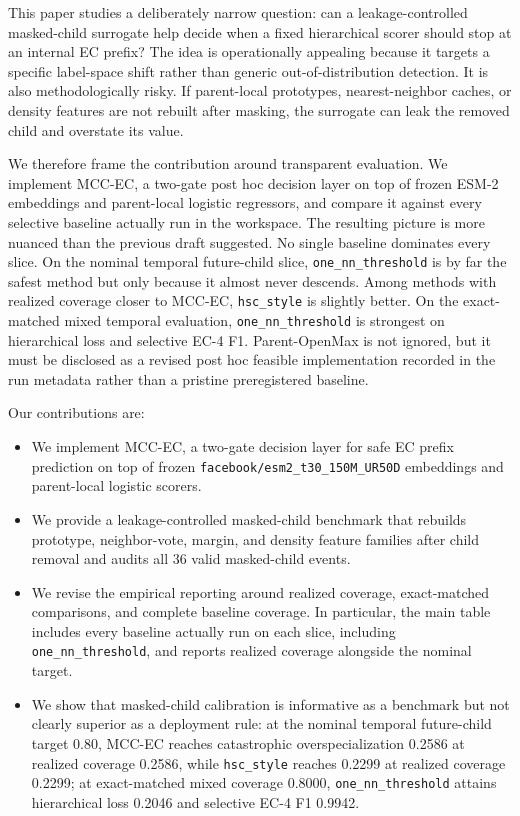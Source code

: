 \documentclass{article}
\newcommand{\method}{MCC-EC\xspace}
\begin{document}
This paper studies a deliberately narrow question: can a leakage-controlled masked-child surrogate help decide when a fixed hierarchical scorer should stop at an internal EC prefix? The idea is operationally appealing because it targets a specific label-space shift rather than generic out-of-distribution detection. It is also methodologically risky. If parent-local prototypes, nearest-neighbor caches, or density features are not rebuilt after masking, the surrogate can leak the removed child and overstate its value.

We therefore frame the contribution around transparent evaluation. We implement \method, a two-gate post hoc decision layer on top of frozen ESM-2 embeddings and parent-local logistic regressors, and compare it against every selective baseline actually run in the workspace. The resulting picture is more nuanced than the previous draft suggested. No single baseline dominates every slice. On the nominal temporal future-child slice, \texttt{one\_nn\_threshold} is by far the safest method but only because it almost never descends. Among methods with realized coverage closer to \method, \texttt{hsc\_style} is slightly better. On the exact-matched mixed temporal evaluation, \texttt{one\_nn\_threshold} is strongest on hierarchical loss and selective EC-4 F1. Parent-OpenMax is not ignored, but it must be disclosed as a revised post hoc feasible implementation recorded in the run metadata rather than a pristine preregistered baseline.

Our contributions are:
\begin{itemize}
\item We implement \method, a two-gate decision layer for safe EC prefix prediction on top of frozen \texttt{facebook/esm2\_t30\_150M\_UR50D} embeddings and parent-local logistic scorers.
\item We provide a leakage-controlled masked-child benchmark that rebuilds prototype, neighbor-vote, margin, and density feature families after child removal and audits all 36 valid masked-child events.
\item We revise the empirical reporting around realized coverage, exact-matched comparisons, and complete baseline coverage. In particular, the main table includes every baseline actually run on each slice, including \texttt{one\_nn\_threshold}, and reports realized coverage alongside the nominal target.
\item We show that masked-child calibration is informative as a benchmark but not clearly superior as a deployment rule: at the nominal temporal future-child target 0.80, \method reaches catastrophic overspecialization 0.2586 at realized coverage 0.2586, while \texttt{hsc\_style} reaches 0.2299 at realized coverage 0.2299; at exact-matched mixed coverage 0.8000, \texttt{one\_nn\_threshold} attains hierarchical loss 0.2046 and selective EC-4 F1 0.9942.
\end{itemize}
\end{document}
